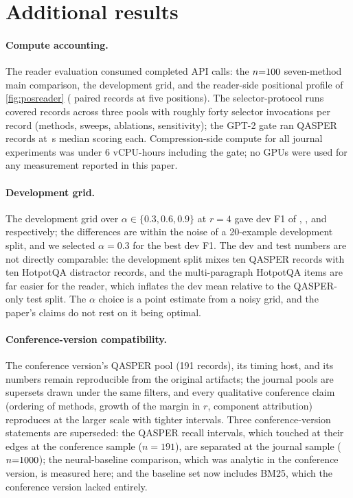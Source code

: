 \documentclass[preprint,12pt]{elsarticle}
\theoremstyle{remark}
\begin{document}
\section{Additional results}
\label{app:results}

\paragraph{Compute accounting.}
The reader evaluation consumed \TotalCalls{} completed API calls:
the $n{=}100$ seven-method main comparison, the development grid,
and the reader-side positional profile of \autoref{fig:posreader}
(\PosRUPairs{} paired records at five positions). The
selector-protocol
runs covered \TotalRecords{} records across three pools with roughly
forty selector invocations per record (methods, sweeps, ablations,
sensitivity); the GPT-2 gate ran \GateN{} QASPER records at
\GateLatMedS\,s median scoring each. Compression-side compute for all
journal experiments was under 6 vCPU-hours including the gate; no
GPUs were used for any measurement reported in this paper.

\paragraph{Development grid.}
The development grid over $\alpha \in \{0.3, 0.6, 0.9\}$ at $r=4$
gave dev F1 of \GridALo, \GridAMid, and \GridAHi{} respectively; the
differences are within the noise of a 20-example development split,
and we selected $\alpha=0.3$ for the best dev F1. The dev and test
numbers are not directly comparable: the development split mixes ten
QASPER records with ten HotpotQA distractor records, and the
multi-paragraph HotpotQA items are far easier for the reader, which
inflates the dev mean relative to the QASPER-only test split. The
$\alpha$ choice is a point estimate from a noisy grid, and the
paper's claims do not rest on it being optimal.

\paragraph{Conference-version compatibility.}
The conference version's QASPER pool (191 records), its timing host,
and its numbers remain reproducible from the original artifacts; the
journal pools are supersets drawn under the same filters, and every
qualitative conference claim (ordering of methods, growth of the
margin in $r$, component attribution) reproduces at the larger scale
with tighter intervals. Three conference-version statements are
superseded: the QASPER recall intervals, which touched at their edges
at the conference sample ($n=191$), are separated at the journal
sample ($n{=}1000$); the neural-baseline
comparison, which was analytic in the conference version, is measured
here; and the baseline set now includes BM25, which the conference
version lacked entirely.
\end{document}
